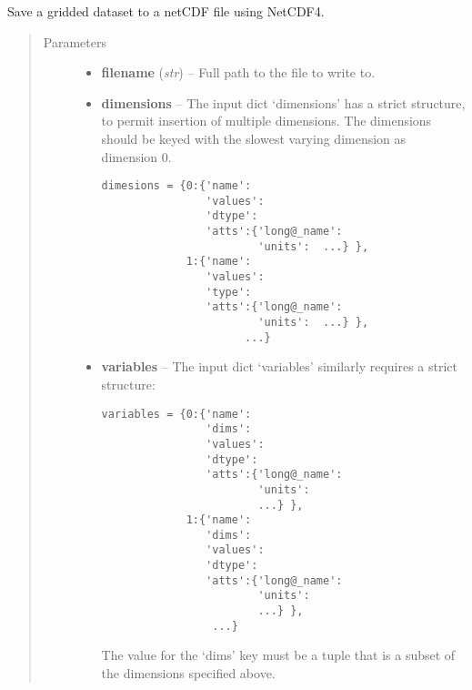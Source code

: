 \documentclass[letterpaper,10pt,english]{sphinxmanual}
\begin{document}
\begin{fulllineitems}
\label{docs/utilities:nctools.nc_save_grid}
Save a gridded dataset to a netCDF file using NetCDF4.
\begin{quote}\begin{description}
\item[{Parameters}] \leavevmode\begin{itemize}
\item {} 
\textbf{filename} (\emph{str}) -- Full path to the file to write to.

\item {} 
\textbf{dimensions} -- 
The input dict `dimensions' has a strict structure, to 
permit insertion of multiple dimensions. The dimensions should be keyed 
with the slowest varying dimension as dimension 0.

\begin{Verbatim}[commandchars=@\[\]]
dimesions = {0:{'name': 
                'values': 
                'dtype': 
                'atts':{'long@_name': 
                        'units':  ...} }, 
             1:{'name': 
                'values': 
                'type': 
                'atts':{'long@_name': 
                        'units':  ...} },
                      ...}
\end{Verbatim}


\item {} 
\textbf{variables} -- 
The input dict `variables' similarly requires a strict structure:

\begin{Verbatim}[commandchars=@\[\]]
variables = {0:{'name': 
                'dims': 
                'values': 
                'dtype': 
                'atts':{'long@_name': 
                        'units': 
                        ...} }, 
             1:{'name': 
                'dims': 
                'values': 
                'dtype': 
                'atts':{'long@_name': 
                        'units': 
                        ...} }, 
                 ...}
\end{Verbatim}

The value for the `dims' key must be a tuple that is a subset of 
the dimensions specified above.



\end{itemize}
\end{description}
\end{quote}
\end{fulllineitems}
\end{document}
